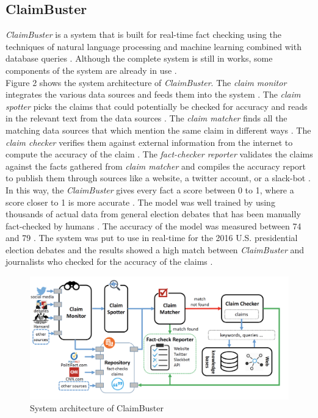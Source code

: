 \documentclass[sigconf]{acmart}
\begin{document}
\subsection{ClaimBuster}
{\em ClaimBuster} is a system that is built for real-time fact checking using the techniques of natural language processing and machine learning combined with database queries \cite{Claimbuster2017}. Although the complete system is still in works, some components of the system are already in use \cite{Claimbuster2017}.\\
Figure 2 shows the system architecture of {\em ClaimBuster}. The {\em claim monitor} integrates the various data sources and feeds them into the system \cite{Claimbuster2017}. The {\em claim spotter} picks the claims that could potentially be checked for accuracy and reads in the relevant text from the data sources \cite{Claimbuster2017}. The {\em claim matcher} finds all the matching data sources that which mention the same claim in different ways \cite{Claimbuster2017}. The {\em claim checker} verifies them against external information from the internet to compute the accuracy of the claim \cite{Claimbuster2017}. The {\em fact-checker reporter} validates the claims against the facts gathered from {\em claim matcher} and compiles the accuracy report to publish them through sources like a website, a twitter account, or a slack-bot \cite{Claimbuster2017}. \\
In this way, the {\em ClaimBuster} gives every fact a score between 0 to 1, where a score closer to 1 is more accurate \cite{Claimbuster2017}. The model was well trained by using thousands of actual data from general election debates that has been manually fact-checked by humans \cite{Claimbuster2017}. The accuracy of the model was measured between 74 and 79 \cite{Claimbuster2017}. The system was put to use in real-time for the 2016 U.S. presidential election debates and the results showed a high match between {\em ClaimBuster} and journalists who checked for the accuracy of the claims \cite{Claimbuster2017}.  

\begin{figure}
\includegraphics[width=1.0\textwidth]{images/fig2.png}
\caption{System architecture of ClaimBuster \cite{Claimbuster2017}}
\end{figure}
\end{document}
